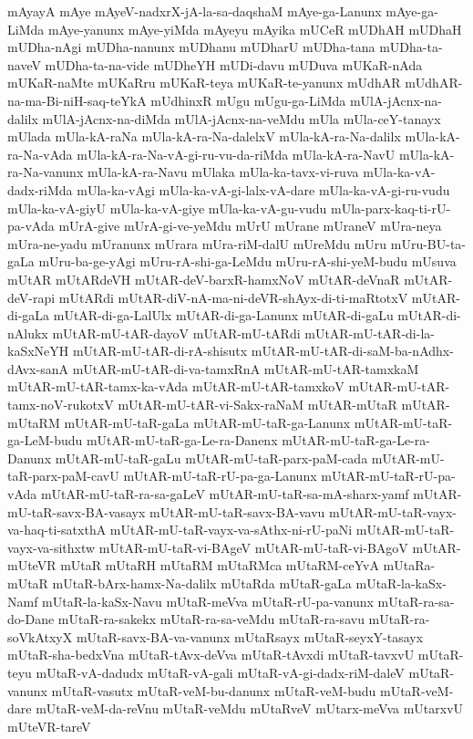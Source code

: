 {mAyayA
mAye
mAyeV-nadxrX-jA-la-sa-daqshaM
mAye-ga-Lanunx
mAye-ga-LiMda
mAye-yanunx
mAye-yiMda
mAyeyu
mAyika
mUCeR
mUDhAH
mUDhaH
mUDha-nAgi
mUDha-nanunx
mUDhanu
mUDharU
mUDha-tana
mUDha-ta-naveV
mUDha-ta-na-vide
mUDheYH
mUDi-davu
mUDuva
mUKaR-nAda
mUKaR-naMte
mUKaRru
mUKaR-teya
mUKaR-te-yanunx
mUdhAR
mUdhAR-na-ma-Bi-niH-saq-teYkA
mUdhinxR
mUgu
mUgu-ga-LiMda
mUlA-jAcnx-na-dalilx
mUlA-jAcnx-na-diMda
mUlA-jAcnx-na-veMdu
mUla
mUla-ceY-tanayx
mUlada
mUla-kA-raNa
mUla-kA-ra-Na-dalelxV
mUla-kA-ra-Na-dalilx
mUla-kA-ra-Na-vAda
mUla-kA-ra-Na-vA-gi-ru-vu-da-riMda
mUla-kA-ra-NavU
mUla-kA-ra-Na-vanunx
mUla-kA-ra-Navu
mUlaka
mUla-ka-tavx-vi-ruva
mUla-ka-vA-dadx-riMda
mUla-ka-vAgi
mUla-ka-vA-gi-lalx-vA-dare
mUla-ka-vA-gi-ru-vudu
mUla-ka-vA-giyU
mUla-ka-vA-giye
mUla-ka-vA-gu-vudu
mUla-parx-kaq-ti-rU-pa-vAda
mUrA-give
mUrA-gi-ve-yeMdu
mUrU
mUrane
mUraneV
mUra-neya
mUra-ne-yadu
mUranunx
mUrara
mUra-riM-dalU
mUreMdu
mUru
mUru-BU-ta-gaLa
mUru-ba-ge-yAgi
mUru-rA-shi-ga-LeMdu
mUru-rA-shi-yeM-budu
mUsuva
mUtAR
mUtARdeVH
mUtAR-deV-barxR-hamxNoV
mUtAR-deVnaR
mUtAR-deV-rapi
mUtARdi
mUtAR-diV-nA-ma-ni-deVR-shAyx-di-ti-maRtotxV
mUtAR-di-gaLa
mUtAR-di-ga-LalUlx
mUtAR-di-ga-Lanunx
mUtAR-di-gaLu
mUtAR-di-nAlukx
mUtAR-mU-tAR-dayoV
mUtAR-mU-tARdi
mUtAR-mU-tAR-di-la-kaSxNeYH
mUtAR-mU-tAR-di-rA-shisutx
mUtAR-mU-tAR-di-saM-ba-nAdhx-dAvx-sanA
mUtAR-mU-tAR-di-va-tamxRnA
mUtAR-mU-tAR-tamxkaM
mUtAR-mU-tAR-tamx-ka-vAda
mUtAR-mU-tAR-tamxkoV
mUtAR-mU-tAR-tamx-noV-rukotxV
mUtAR-mU-tAR-vi-Sakx-raNaM
mUtAR-mUtaR
mUtAR-mUtaRM
mUtAR-mU-taR-gaLa
mUtAR-mU-taR-ga-Lanunx
mUtAR-mU-taR-ga-LeM-budu
mUtAR-mU-taR-ga-Le-ra-Danenx
mUtAR-mU-taR-ga-Le-ra-Danunx
mUtAR-mU-taR-gaLu
mUtAR-mU-taR-parx-paM-cada
mUtAR-mU-taR-parx-paM-cavU
mUtAR-mU-taR-rU-pa-ga-Lanunx
mUtAR-mU-taR-rU-pa-vAda
mUtAR-mU-taR-ra-sa-gaLeV
mUtAR-mU-taR-sa-mA-sharx-yamf
mUtAR-mU-taR-savx-BA-vasayx
mUtAR-mU-taR-savx-BA-vavu
mUtAR-mU-taR-vayx-va-haq-ti-satxthA
mUtAR-mU-taR-vayx-va-sAthx-ni-rU-paNi
mUtAR-mU-taR-vayx-va-sithxtw
mUtAR-mU-taR-vi-BAgeV
mUtAR-mU-taR-vi-BAgoV
mUtAR-mUteVR
mUtaR
mUtaRH
mUtaRM
mUtaRMca
mUtaRM-ceYvA
mUtaRa-mUtaR
mUtaR-bArx-hamx-Na-dalilx
mUtaRda
mUtaR-gaLa
mUtaR-la-kaSx-Namf
mUtaR-la-kaSx-Navu
mUtaR-meVva
mUtaR-rU-pa-vanunx
mUtaR-ra-sa-do-Dane
mUtaR-ra-sakekx
mUtaR-ra-sa-veMdu
mUtaR-ra-savu
mUtaR-ra-soVkAtxyX
mUtaR-savx-BA-va-vanunx
mUtaRsayx
mUtaR-seyxY-tasayx
mUtaR-sha-bedxVna
mUtaR-tAvx-deVva
mUtaR-tAvxdi
mUtaR-tavxvU
mUtaR-teyu
mUtaR-vA-dadudx
mUtaR-vA-gali
mUtaR-vA-gi-dadx-riM-daleV
mUtaR-vanunx
mUtaR-vasutx
mUtaR-veM-bu-danunx
mUtaR-veM-budu
mUtaR-veM-dare
mUtaR-veM-da-reVnu
mUtaR-veMdu
mUtaRveV
mUtarx-meVva
mUtarxvU
mUteVR-tareV
}
